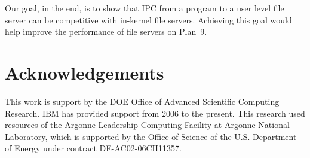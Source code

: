 \documentclass[letterpaper,twocolumn,10pt]{article}
\begin{document}
Our goal, in the end, is to show that IPC from a program to a user level file server can be competitive 
with in-kernel file servers. Achieving this goal would help improve the performance of file servers on Plan~9. 
\section{Acknowledgements}
This work is support by the DOE Office of Advanced Scientific Computing Research. IBM has provided support from 2006 to the present. This research used resources of the Argonne Leadership Computing Facility
 at Argonne National Laboratory, which is supported by the Office of Science
 of the U.S.
 Department of Energy under contract DE-AC02-06CH11357.

 

\end{document}
